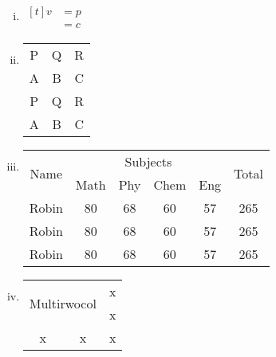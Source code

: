 \documentclass[10pt,a4paper]{article}
\begin{document}
	
	\begin{enumerate}[(i)]
		\item 
		$\begin{aligned}[t]
		v &=p\\
		&=c
		\end{aligned}$
		\item 
		\begin{tabular}{c c c}
			\toprule
			P& Q&R\\
			\cmidrule{1-2}
			A& B&C\\
			\cmidrule(lr){2-3}
			P& Q&R\\
			\cmidrule[2pt](lr){1-1}
			A& B&C\\
			\bottomrule
		\end{tabular}
	\item 
		\begin{tabular}{|c|c|c|c|c|c|}
			\hline
			\multirow{2}{*}{Name}& \multicolumn{4}{|c|}{Subjects}& \multirow{2}{*}{Total}\\
			\cline{2-5}
		&	Math & Phy & Chem & Eng&\\
			\hline
			\hline
			Robin & 80 & 68 & 60 & 57 & 265\\
			\hline
			Robin & 80 & 68 & 60 & 57 & 265\\
			\hline
			Robin & 80 & 68 & 60 & 57 & 265\\
			\hline
		\end{tabular}
	\item
	\begin{tabular}{|c |c |c|}
		\hline
		\multicolumn{2}{|c|}{\multirow{2}{*}{Multirwocol}}&x\\
		\multicolumn{2}{|c|}{} &x\\
		\hline
		x& x& x\\
		\hline
	\end{tabular}
	\end{enumerate}
\end{document}
